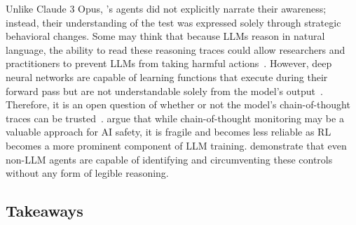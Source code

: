 \documentclass[10pt]{article}
\def\citep#1{}%
\def\citet#1{}%
\def\citeauthor#1{}%
\begin{document}
Unlike Claude 3 Opus, \citeauthor{wilke2001evolution}'s agents did not explicitly narrate their awareness; instead, their understanding of the test was expressed solely through strategic behavioral changes. 
Some may think that because LLMs reason in natural language, the ability to read these reasoning traces could allow researchers and practitioners to prevent LLMs from taking harmful actions~\citep{guan2025monitoringmonitorability, baker2025monitoringreasoningmodelsmisbehavior, emmons2025chainthoughtnecessarylanguage, hu2023ThoughtCloning}. 
However, deep neural networks are capable of learning functions that execute during their forward pass but are not understandable solely from the model's output~\citep{nanda2023progress}. 
Therefore, it is an open question of whether or not the model's chain-of-thought traces can be trusted~\citep{lanham2023measuringfaithfulnesschainofthoughtreasoning, turpin2023languagemodelsdontsay}.
\citet{korbak2025chain} argue that while chain-of-thought monitoring may be a valuable approach for AI safety, it is fragile and becomes less reliable as RL becomes a more prominent component of LLM training.
\citet{wilke2001evolution} demonstrate that even non-LLM agents are capable of identifying and circumventing these controls without any form of legible reasoning.

\subsection{Takeaways}
\end{document}
